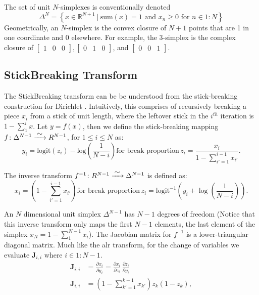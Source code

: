 \documentclass[11pt]{article}
\newcommand{\setcomp}[2]{\left\{ #1 \ \Big|\ #2 \right\}}
\newcommand{\rngto}[1]{1{:}#1}
\begin{document}
The set of unit $N$-simplexes is conventionally denoted
\[
  \Delta^N = \setcomp{x \in \mathbb{R}^{N + 1}}{\textrm{sum}(x) = 1
    \textrm{ and }
    x_n \geq 0 \textrm{ for } n \in \rngto{N}}
\]
Geometrically, an $N$-simplex is the convex closure of $N+1$ points
that are 1 in one coordinate and 0 elsewhere.  For example, the
3-simplex is the complex closure of
$\begin{bmatrix}1 & 0 & 0 \end{bmatrix},
\begin{bmatrix} 0 & 1 & 0 \end{bmatrix}$,
and $\begin{bmatrix} 0 & 0 & 1 \end{bmatrix}$.

\subsection{StickBreaking Transform}

The StickBreaking transform can be be understood from the stick-breaking construction for Dirichlet \cite{sethurman}. Intuitively, this comprises of recursively breaking a piece $x_i$ from a stick of unit length, where the leftover stick in the $i^{th}$ iteration is $ 1 - \sum_{1}^{i}x$. Let $y = f(x)$, then we define the stick-breaking mapping $ f \colon \Delta^{N-1} \xrightarrow{\makebox[0.4cm]{$\sim$}}  R^{N-1}$, for $1 \leq i \leq N$ as:	
\[
y_i
= \mathrm{logit}(z_i) - \mbox{log}\left(\frac{1}{N-i}
   \right) \text{for break proportion} \, 
   z_i = \frac{x_i}{1 - \sum_{i' = 1}^{i-1} x_{i'}}.
\]

The inverse transform $ f^{-1} \colon R^{N-1} \xrightarrow{\makebox[0.4cm]{$\sim$}}  \Delta^{N-1}$ is defined as:
\[
x_i =
\left( 1 - \sum_{i'=1}^{i-1} x_{i'} \right) \text{for break proportion} \, z_i = \mathrm{logit}^{-1} \left( y_i
                             + \log \left( \frac{1}{N - i}
                                            \right)\right).
                                            \]
                            
An $N$ dimensional unit simplex $\Delta^{N-1}$ has $N-1$ degrees of freedom (Notice that this inverse transform only maps the first $N-1$ elements, the last element of the simplex $x_{N} = 1 - \sum_1^{N-1}{x_i}$). The Jacobian matrix for $f^{-1}$ is a lower-triangular diagonal matrix. Much like the alr transform, for the change of variables we evaluate $\mathbf{J}_{i, i}$ where $i \in 1:N-1$.
\begin{align*}
\mathbf{J}_{i, i} &= \frac{\partial x_i}{\partial y_i}
=
\frac{\partial x_i}{\partial z_i} \,
\frac{\partial z_i}{\partial y_i}\\
\mathbf{J}_{i, i} &= \left(
  1 - \sum_{k' = 1}^{k-1} x_{k'}
   \right) z_k (1 - z_k),
\end{align*}
\end{document}
